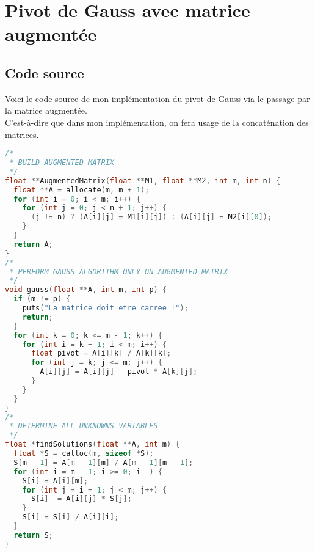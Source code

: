 \section{Pivot de Gauss avec matrice augmentée}
\subsection{Code source}
Voici le code source de mon implémentation du pivot de Gauss via le passage par la matrice augmentée.\\
C'est-à-dire que dans mon implémentation, on fera usage de la concaténation des matrices.
\begin{lstlisting}[language=C,inputencoding=utf8, basicstyle=\fontsize{8}{10}\selectfont]
/*
 * BUILD AUGMENTED MATRIX
 */
float **AugmentedMatrix(float **M1, float **M2, int m, int n) {
  float **A = allocate(m, m + 1);
  for (int i = 0; i < m; i++) {
    for (int j = 0; j < n + 1; j++) {
      (j != n) ? (A[i][j] = M1[i][j]) : (A[i][j] = M2[i][0]);
    }
  }
  return A;
}
/*
 * PERFORM GAUSS ALGORITHM ONLY ON AUGMENTED MATRIX
 */
void gauss(float **A, int m, int p) {
  if (m != p) {
    puts("La matrice doit etre carree !");
    return;
  }
  for (int k = 0; k <= m - 1; k++) {
    for (int i = k + 1; i < m; i++) {
      float pivot = A[i][k] / A[k][k];
      for (int j = k; j <= m; j++) {
        A[i][j] = A[i][j] - pivot * A[k][j];
      }
    }
  }
}
/*
 * DETERMINE ALL UNKNOWNS VARIABLES
 */
float *findSolutions(float **A, int m) {
  float *S = calloc(m, sizeof *S);
  S[m - 1] = A[m - 1][m] / A[m - 1][m - 1];
  for (int i = m - 1; i >= 0; i--) {
    S[i] = A[i][m];
    for (int j = i + 1; j < m; j++) {
      S[i] -= A[i][j] * S[j];
    }
    S[i] = S[i] / A[i][i];
  }
  return S;
}
\end{lstlisting}
